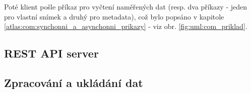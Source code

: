 Poté klient pošle příkaz pro vyčtení naměřených dat (resp. dva příkazy - jeden pro vlastní snímek a druhý pro metadata), což bylo popsáno v kapitole \ref{atlas:com:synchonni_a_asynchonni_prikazy} - viz obr. \ref{fig:uml:com_priklad}.

\subsection{REST API server}\label{atlas:cont:api}


\clearpage
\subsection{Zpracování a ukládání dat}\label{atlas:cont:dataSaver}









